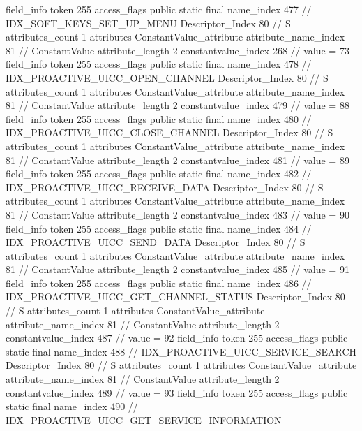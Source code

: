 {{{{{{{				}
				}
			}
			field_info {
				token	255
				access_flags	public static final
				name_index	477		// IDX_SOFT_KEYS_SET_UP_MENU
				Descriptor_Index	80		// S
				attributes_count	1
				attributes {
				ConstantValue_attribute {
					attribute_name_index	81		// ConstantValue
					attribute_length	2
					constantvalue_index	268		// value = 73
				}
				}
			}
			field_info {
				token	255
				access_flags	public static final
				name_index	478		// IDX_PROACTIVE_UICC_OPEN_CHANNEL
				Descriptor_Index	80		// S
				attributes_count	1
				attributes {
				ConstantValue_attribute {
					attribute_name_index	81		// ConstantValue
					attribute_length	2
					constantvalue_index	479		// value = 88
				}
				}
			}
			field_info {
				token	255
				access_flags	public static final
				name_index	480		// IDX_PROACTIVE_UICC_CLOSE_CHANNEL
				Descriptor_Index	80		// S
				attributes_count	1
				attributes {
				ConstantValue_attribute {
					attribute_name_index	81		// ConstantValue
					attribute_length	2
					constantvalue_index	481		// value = 89
				}
				}
			}
			field_info {
				token	255
				access_flags	public static final
				name_index	482		// IDX_PROACTIVE_UICC_RECEIVE_DATA
				Descriptor_Index	80		// S
				attributes_count	1
				attributes {
				ConstantValue_attribute {
					attribute_name_index	81		// ConstantValue
					attribute_length	2
					constantvalue_index	483		// value = 90
				}
				}
			}
			field_info {
				token	255
				access_flags	public static final
				name_index	484		// IDX_PROACTIVE_UICC_SEND_DATA
				Descriptor_Index	80		// S
				attributes_count	1
				attributes {
				ConstantValue_attribute {
					attribute_name_index	81		// ConstantValue
					attribute_length	2
					constantvalue_index	485		// value = 91
				}
				}
			}
			field_info {
				token	255
				access_flags	public static final
				name_index	486		// IDX_PROACTIVE_UICC_GET_CHANNEL_STATUS
				Descriptor_Index	80		// S
				attributes_count	1
				attributes {
				ConstantValue_attribute {
					attribute_name_index	81		// ConstantValue
					attribute_length	2
					constantvalue_index	487		// value = 92
				}
				}
			}
			field_info {
				token	255
				access_flags	public static final
				name_index	488		// IDX_PROACTIVE_UICC_SERVICE_SEARCH
				Descriptor_Index	80		// S
				attributes_count	1
				attributes {
				ConstantValue_attribute {
					attribute_name_index	81		// ConstantValue
					attribute_length	2
					constantvalue_index	489		// value = 93
				}
				}
			}
			field_info {
				token	255
				access_flags	public static final
				name_index	490		// IDX_PROACTIVE_UICC_GET_SERVICE_INFORMATION
}}}}}
